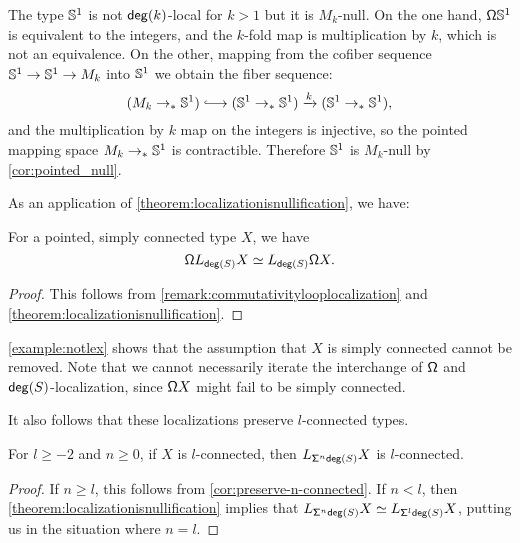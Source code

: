 \begin{eg}
    The type $\sphere{1}$ is not $\degg(k)$-local for $k > 1$ but it is $M_k$-null.
    On the one hand, $\loopspacesym \sphere{1}$ is equivalent to the integers, and the $k$-fold map
    is multiplication by $k$, which is not an equivalence.
    On the other, mapping from the cofiber sequence $\sphere{1}\to \sphere{1} \to M_k$ into $\sphere{1}$ we
    obtain the fiber sequence:
    \[
        (M_k \to_\ast \sphere{1}) \longhookrightarrow (\sphere{1} \to_\ast \sphere{1}) \xrightarrow{k} (\sphere{1}\to_\ast \sphere{1}),
    \]
    and the multiplication by $k$ map on the integers is injective, so the pointed mapping space $M_k \to_\ast \sphere{1}$ is contractible. Therefore $\sphere{1}$ is $M_k$-null by \cref{cor:pointed_null}.
\end{eg}

As an application of \cref{theorem:localizationisnullification}, we have:

\begin{cor}\label{corollary:commutativitylooplocalizationsimpconn}
    For a pointed, simply connected type $X$, we have
    \[
        \loopspacesym L_{\degg(S)} X \simeq L_{\degg(S)} \loopspacesym X.
    \]
\end{cor}

\begin{proof}
This follows from \cref{remark:commutativitylooplocalization} and \cref{theorem:localizationisnullification}.
\end{proof}

\cref{example:notlex} shows that the assumption that $X$ is simply connected cannot be removed.
Note that we cannot necessarily iterate the interchange of $\loopspacesym$ and $\degg(S)$-localization,
since $\loopspacesym X$ might fail to be simply connected.

\medskip

It also follows that these localizations preserve $l$-connected types.

\begin{cor}\label{corollary:plocalizationpreservesconnectedness}
    For $l \geq -2$ and $n \geq 0$, if $X$ is $l$-connected, then $L_{\susp[n] \degg(S)} X$ is $l$-connected.
\end{cor}

\begin{proof}
    If $n \geq l$, this follows from \cref{cor:preserve-n-connected}.
    If $n < l$, then \cref{theorem:localizationisnullification} implies
    that $L_{\susp[n] \degg(S)} X \eqvsym L_{\susp[l] \degg(S)} X$, putting us
    in the situation where $n = l$.
\end{proof}

